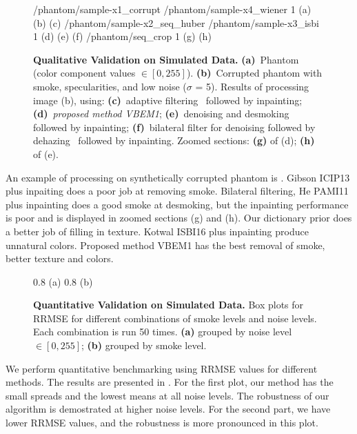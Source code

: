 \begin{figure}[!h]
     {/phantom/sample-x1_corrupt} {/phantom/sample-x4_wiener} {1} {(a)} {(b)} {(c)}
     {/phantom/sample-x2_seq_huber} {/phantom/sample-x3_isbi} {1} {(d)} {(e)} {(f)}
     {/phantom/seq_crop} {1} {(g)} {(h)}
    \vspace{-10pt}
    \caption
    {
        {\bf Qualitative Validation on Simulated Data. }
        {\bf (a)}~Phantom (color component values $\in [0,255]$).
        {\bf (b)}~Corrupted phantom with smoke, specularities, and low noise ($\sigma$ = 5).
        Results of processing image (b), using:
        {\bf (c)}~adaptive filtering~\cite{gibson2013wiener} followed by inpainting;
        {\bf (d)}~{\em proposed method VBEM1};
        {\bf (e)}~denoising and desmoking~\cite{kotwal2016joint} followed by inpainting;
        {\bf (f)}~bilateral filter for denoising followed by dehazing~\cite{he2011dark} followed by inpainting.
        Zoomed sections:
        {\bf (g)} of (d);
        {\bf (h)} of (e).
    }
    \label{fig:phantomImages}
\end{figure}
An example of processing on synthetically corrupted phantom is . Gibson ICIP13 \cite{gibson2013wiener} plus inpaiting does a poor job at removing smoke. Bilateral filtering, He PAMI11 \cite{he2011dark} plus inpainting does a good smoke at desmoking, but the inpainting performance is poor and is displayed in zoomed sections (g) and (h). Our dictionary prior does a better job of filling in texture. Kotwal ISBI16 plus inpainting produce unnatural colors. Proposed method VBEM1 has the best removal of smoke, better texture and colors.

\begin{figure}[!h]
     {0.8} {(a)}
     {0.8} {(b)}
    \caption{
        {\bf Quantitative Validation on Simulated Data.}
        Box plots for RRMSE for different combinations of smoke levels and noise levels. Each combination is run 50 times.
        {\bf (a)} grouped by noise level $\in [0, 255]$;
        {\bf (b)} grouped by smoke level.
    }
    \label{fig:phantomBoxplots}
\end{figure}
We perform quantitative benchmarking using RRMSE values for different methods. The results are presented in . For the first plot, our method has the small spreads and the lowest means at all noise levels. The robustness of our algorithm is demostrated at higher noise levels. For the second part, we have lower RRMSE values, and the robustness is more pronounced in this plot.


